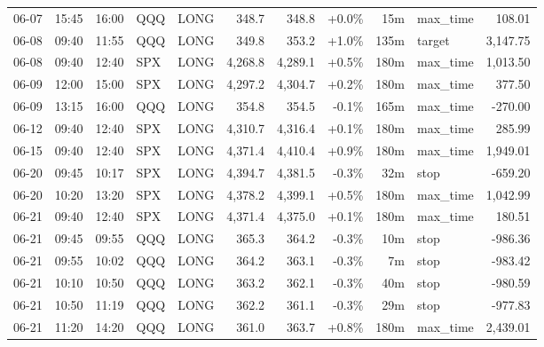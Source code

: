 \documentclass[11pt,a4paper,twoside]{article}
\begin{document}
\begin{center}
\begin{longtable}{>{\color{txtmain}}l l l l l r r r r >{\color{txtmain}}l r}
06-07 & 15:45 & 16:00 & QQQ & LONG & 348.7 & 348.8 & \textcolor{wingreen}{+0.0\%} & 15m & max\_time & \textcolor{wingreen}{108.01} \\
06-08 & 09:40 & 11:55 & QQQ & LONG & 349.8 & 353.2 & \textcolor{wingreen}{+1.0\%} & 135m & target & \textcolor{wingreen}{3,147.75} \\
06-08 & 09:40 & 12:40 & SPX & LONG & 4,268.8 & 4,289.1 & \textcolor{wingreen}{+0.5\%} & 180m & max\_time & \textcolor{wingreen}{1,013.50} \\
06-09 & 12:00 & 15:00 & SPX & LONG & 4,297.2 & 4,304.7 & \textcolor{wingreen}{+0.2\%} & 180m & max\_time & \textcolor{wingreen}{377.50} \\
06-09 & 13:15 & 16:00 & QQQ & LONG & 354.8 & 354.5 & \textcolor{lossred}{-0.1\%} & 165m & max\_time & \textcolor{lossred}{-270.00} \\
06-12 & 09:40 & 12:40 & SPX & LONG & 4,310.7 & 4,316.4 & \textcolor{wingreen}{+0.1\%} & 180m & max\_time & \textcolor{wingreen}{285.99} \\
06-15 & 09:40 & 12:40 & SPX & LONG & 4,371.4 & 4,410.4 & \textcolor{wingreen}{+0.9\%} & 180m & max\_time & \textcolor{wingreen}{1,949.01} \\
06-20 & 09:45 & 10:17 & SPX & LONG & 4,394.7 & 4,381.5 & \textcolor{lossred}{-0.3\%} & 32m & stop & \textcolor{lossred}{-659.20} \\
06-20 & 10:20 & 13:20 & SPX & LONG & 4,378.2 & 4,399.1 & \textcolor{wingreen}{+0.5\%} & 180m & max\_time & \textcolor{wingreen}{1,042.99} \\
06-21 & 09:40 & 12:40 & SPX & LONG & 4,371.4 & 4,375.0 & \textcolor{wingreen}{+0.1\%} & 180m & max\_time & \textcolor{wingreen}{180.51} \\
06-21 & 09:45 & 09:55 & QQQ & LONG & 365.3 & 364.2 & \textcolor{lossred}{-0.3\%} & 10m & stop & \textcolor{lossred}{-986.36} \\
06-21 & 09:55 & 10:02 & QQQ & LONG & 364.2 & 363.1 & \textcolor{lossred}{-0.3\%} & 7m & stop & \textcolor{lossred}{-983.42} \\
06-21 & 10:10 & 10:50 & QQQ & LONG & 363.2 & 362.1 & \textcolor{lossred}{-0.3\%} & 40m & stop & \textcolor{lossred}{-980.59} \\
06-21 & 10:50 & 11:19 & QQQ & LONG & 362.2 & 361.1 & \textcolor{lossred}{-0.3\%} & 29m & stop & \textcolor{lossred}{-977.83} \\
06-21 & 11:20 & 14:20 & QQQ & LONG & 361.0 & 363.7 & \textcolor{wingreen}{+0.8\%} & 180m & max\_time & \textcolor{wingreen}{2,439.01} \\

\end{longtable}
\end{center}
\end{document}
